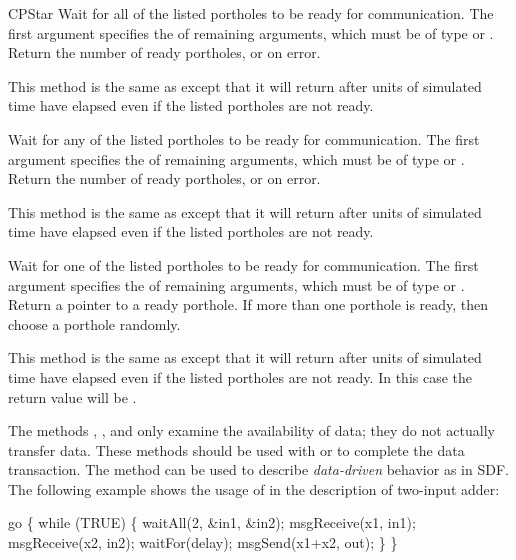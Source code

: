 \begin{indexlist}{CPStar}
Wait for all of the listed portholes to be ready for communication.
The first argument specifies the  of remaining arguments,
which must be of type  or .
Return the number of ready portholes, or  on error.

This method is the same as  except that it will return
after  units of simulated time have elapsed even if the
listed portholes are not ready.

Wait for any of the listed portholes to be ready for communication.
The first argument specifies the  of remaining arguments,
which must be of type  or .
Return the number of ready portholes, or  on error.

This method is the same as  except that it will return
after  units of simulated time have elapsed even if the
listed portholes are not ready.

Wait for one of the listed portholes to be ready for communication.
The first argument specifies the  of remaining arguments,
which must be of type  or .
Return a pointer to a ready porthole.  If more than one porthole is
ready, then choose a porthole randomly.

This method is the same as  except that it will return
after  units of simulated time have elapsed even if the
listed portholes are not ready.  In this case the return value will be
.

\end{indexlist}

The methods , , and  only
examine the availability of data; they do not actually
transfer data.  These methods should be used with  or
 to complete the data transaction.  The 
method can be used to describe \emph{data-driven} behavior as in SDF.
The following example shows the usage of  in the description
of two-input adder:

\begin{example}
go \{
    while (TRUE) \{
        waitAll(2, &in1, &in2);
        msgReceive(x1, in1);
        msgReceive(x2, in2);
        waitFor(delay);
        msgSend(x1+x2, out);
    \}
\}
\end{example}

